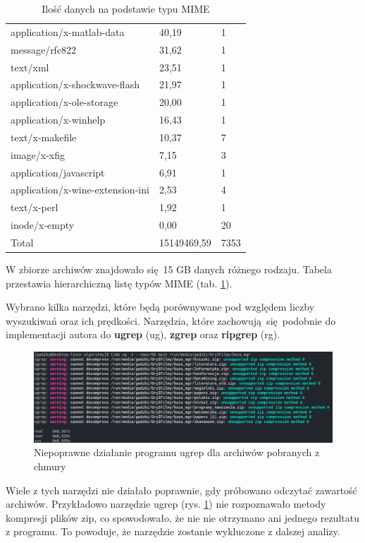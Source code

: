 \begin{table}[p]
\begin{tabular}{|l|l|l|}
application/x-matlab-data & 40,19 & 1 \\
message/rfc822 & 31,62 & 1 \\
text/xml & 23,51 & 1 \\
application/x-shockwave-flash & 21,97 & 1 \\
application/x-ole-storage & 20,00 & 1 \\
application/x-winhelp & 16,43 & 1 \\
text/x-makefile & 10,37 & 7 \\
image/x-xfig & 7,15 & 3 \\
application/javascript & 6,91 & 1 \\
application/x-wine-extension-ini & 2,53 & 4 \\
text/x-perl & 1,92 & 1 \\
inode/x-empty & 0,00 & 20 \\
        \hline
Total & 15149469,59 & 7353 \\
        \hline
    \end{tabular}
    \caption{Ilość danych na podstawie typu MIME}
    \label{tabela:typy-MIME-z-iloscia}
\end{table}

W zbiorze archiwów znajdowało się 15 GB danych różnego rodzaju. Tabela 
przestawia hierarchiczną listę typów MIME (tab. \ref{tabela:typy-MIME-z-iloscia}).

Wybrano kilka narzędzi, które będą porównywane pod względem liczby wyszukiwań
oraz ich prędkości. Narzędzia, które zachowują się podobnie do implementacji
autora do \textbf{ugrep} (ug), \textbf{zgrep} oraz \textbf{ripgrep} (rg). 

\begin{figure}[htbp]
\centering
\includegraphics[width=1\textwidth]{./images/ugrep-errors.png}
\caption{Niepoprawne działanie programu ugrep dla archiwów pobranych z chmury}
\label{fig:ugrepErrors}
\end{figure}

Wiele z tych narzędzi nie działało poprawnie, gdy próbowano odczytać zawartość
archiwów. Przykładowo narzędzie ugrep (rys. \ref{fig:ugrepErrors}) nie rozpoznawało 
metody kompresji plików zip, co spowodowało, że nie nie otrzymano ani 
jednego rezultatu z programu. To powoduje, że narzędzie zostanie wykluczone z 
dalszej analizy.

